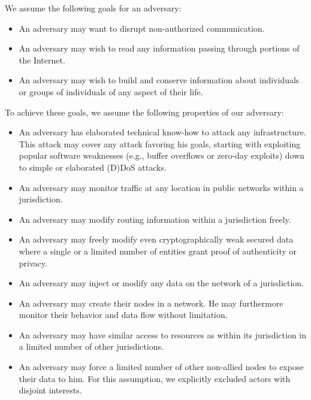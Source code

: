 We assume the following goals for an adversary:
\begin{itemize}
	\item An adversary may want to disrupt non-authorized communication.
	\item An adversary may wish to read any information passing through portions of the Internet.
	\item An adversary may wish to build and conserve information about individuals or groups of individuals of any aspect of their life. 
\end{itemize}

To achieve these goals, we assume the following properties of our adversary:
\begin{itemize}
	\item An adversary has elaborated technical know-how to attack any infrastructure. This attack may cover any attack favoring his goals, starting with exploiting popular software weaknesses (e.g., buffer overflows or zero-day exploits) down to simple or elaborated (D)DoS attacks.
	
	\item An adversary may monitor traffic at any location in public networks within a jurisdiction.
	
	\item An adversary may modify routing information within a jurisdiction freely.
	
	\item An adversary may freely modify even cryptographically weak secured data where a single or a limited number of entities grant proof of authenticity or privacy.
	\item An adversary may inject or modify any data on the network of a jurisdiction.
	
	\item An adversary may create their nodes in a network. He may furthermore monitor their behavior and data flow without limitation.
	
	\item An adversary may have similar access to resources as within its jurisdiction in a limited number of other jurisdictions.
	
	\item An adversary may force a limited number of other non-allied nodes to expose their data to him. For this assumption, we explicitly excluded actors with disjoint interests.
	
\end{itemize}

